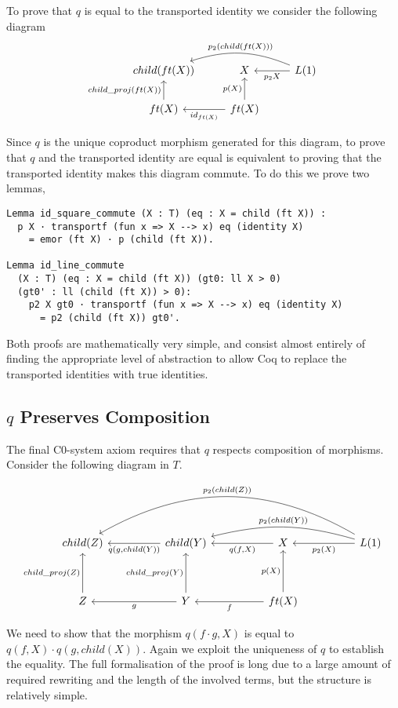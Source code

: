 To prove that $q$ is equal to the transported identity we consider the following
diagram
\[
\begin{tikzcd}
    child(ft(X)) &
    X & 
    L(1)
    \ar[l, "p_2 X"]
    \ar[ll, bend right=20, "p_2 (child(ft(X)))"'] \\
    ft(X)
    \ar[u, "child\_proj(ft(X))"] &
    ft(X)
    \ar[u, "p(X)"]
    \ar[l, "id_{ft(X)}"] &
\end{tikzcd}    
\]

Since $q$ is the unique coproduct morphism generated for this diagram, to prove
that $q$ and the transported identity are equal is equivalent to proving that
the transported identity makes this diagram commute. To do this we prove two
lemmas,
\begin{lstlisting}
Lemma id_square_commute (X : T) (eq : X = child (ft X)) : 
  p X · transportf (fun x => X --> x) eq (identity X)
    = emor (ft X) · p (child (ft X)).

Lemma id_line_commute 
  (X : T) (eq : X = child (ft X)) (gt0: ll X > 0) 
  (gt0' : ll (child (ft X)) > 0):
    p2 X gt0 · transportf (fun x => X --> x) eq (identity X)
      = p2 (child (ft X)) gt0'.
\end{lstlisting}
Both proofs are mathematically very simple, and consist almost entirely of
finding the appropriate level of abstraction to allow Coq to replace the
transported identities with true identities.

\subsection{$q$ Preserves Composition}
The final C0-system axiom requires that $q$ respects composition of morphisms.
Consider the following diagram in $T$.

\[
\begin{tikzcd}[sep=huge]
    child(Z)&
    child(Y)
    \ar[l, "{q(g, child(Y))}"]&
    X
    \ar[l, "{q(f, X)}"]&
    L(1)
    \ar[l, "p_2(X)"]
    \ar[ll, bend right=15, "p_2(child(Y))"']
    \ar[lll, bend right=30, "p_2(child(Z))"']\\
    Z
    \ar[u,"child\_proj(Z)"]&
    Y
    \ar[l, "g"]
    \ar[u, "child\_proj(Y)"]&
    ft(X)
    \ar[l, "f"]
    \ar[u, "p(X)"]
\end{tikzcd}    
\]

We need to show that the morphism $q(f\cdot g, X)$ is equal to $q(f, X)\cdot
q(g, child(X))$. Again we exploit the uniqueness of $q$ to establish the
equality. The full formalisation of the proof is long due to a large amount of
required rewriting and the length of the involved terms, but the structure is
relatively simple.

